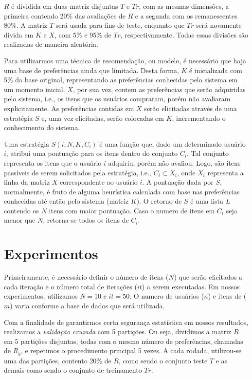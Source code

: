$R$ é dividida em duas matriz disjuntas $T$ e $Tr$, com as mesmas dimensões, a primeira contendo 20\% das avaliações de $R$ e a segunda com os remanescentes 80\%. A matriz $T$ será usada para fins de teste, enquanto que $Tr$ será novamente divida em $K$ e $X$, com 5\% e 95\% de $Tr$, respectivamente. Todas essas divisões são realizadas de maneira aleatória.

Para utilizarmos uma técnica de recomendação, ou modelo, é necessário que haja uma base de preferências ainda que limitada. Desta forma, $K$ é inicializada com 5\% da base original, representando as preferências conhecidas pelo sistema em um momento inicial. $X$, por sua vez, contem as preferências que serão adquiridas pelo sistema, i.e., os itens que os usuários compraram, porém não avaliaram explicitamente. As preferências contidas em $X$ serão elicitadas através de uma estratégia $S$ e, uma vez elicitadas, serão colocadas em $K$, incrementando o conhecimento do sistema.

Uma estratégia $S(i, N, K, C_i)$ é uma função que, dado um determinado usuário $i$, atribui uma pontuação para os itens dentro do conjunto $C_i$. Tal conjunto representa os itens que o usuário $i$ adquiriu, porém não avaliou. Logo, são itens passíveis de serem solicitados pela estratégia, i.e., $C_i \subset X_i$, onde $X_i$ representa a linha da matriz $X$ correspondente ao usuário $i$. A pontuação dada por $S$, normalmente, é fruto de alguma heurística calculada com base nas preferências conhecidas até então pelo sistema (matriz $K$). O retorno de $S$ é uma lista $L$ contendo os $N$ itens com maior pontuação. Caso o numero de itens em $C_i$ seja menor que $N$, retorna-se todos os itens de $C_i$.

\section{Experimentos}

Primeiramente, é necessário definir o número de itens ($N$) que serão elicitados a cada iteração e o número total de iterações ($it$) a serem executadas. Em nossos experimentos, utilizamos $N=10$ e $it=50$. O numero de usuários ($n$) e itens de ($m$) varia conforme a base de dados que será utilizada.

Com a finalidade de garantirmos certa segurança estatística em nossos resultados, realizamos a \textit{validação cruzada} com 5 partições. Ou seja, dividimos a matriz $R$ em 5 partições disjuntas, todas com o mesmo número de preferências, chamadas de $R_y$, e repetimos o procedimento principal 5 vezes. A cada rodada, utilizou-se uma das partições, contento 20\% de $R$, como sendo o conjunto teste $T$ e as demais como sendo o conjunto de treinamento $Tr$.

